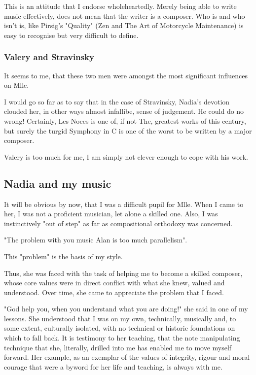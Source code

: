 \documentclass{article}
\begin{document}
This is an attitude that I endorse wholeheartedly.
Merely being able to write music effectively, does not mean that the writer is a composer.
Who is and who isn't is, like Pirsig's "Quality" (Zen and The Art of Motorcycle Maintenance) is easy to recognise but very difficult to define.

\subsubsection{Valery and Stravinsky}

It seems to me, that these two men were amongst the most significant influences on Mlle.

I would go so far as to say that in the case of Stravinsky, Nadia's devotion clouded her, in other ways almost infallibe, sense of judgement.
He could do no wrong!
Certainly, Les Noces is one of, if not The, greatest works of this century, but surely the turgid Symphony in C is one of the worst to be written by a major composer.

Valery is too much for me, I am simply not clever enough to cope with his work.

\subsection{Nadia and my music}

It will be obvious by now, that I was a difficult pupil for Mlle.
When I came to her, I was not a proficient musician, let alone a skilled one.
Also, I was instinctively "out of step" as far as compositional orthodoxy was concerned.

"The problem with you music Alan is too much parallelism".

This "problem" is the basis of my style.

Thus, she was faced with the task of helping me to become a skilled composer, whose core values were in direct conflict with what she knew, valued and understood.
Over time, she came to appreciate the problem that I faced.

"God help you, when you understand what you are doing!" she said in one of my lessons.
She understood that I was on my own, technically, musically and, to some extent, culturally isolated, with no technical or historic foundations on which to fall back.
It is testimony to her teaching, that the note manipulating technique that she, literally, drilled into me has enabled me to move myself forward.
Her example, as an exemplar of the values of integrity, rigour and moral courage that were a byword for her life and teaching, is always with me.
\end{document}
